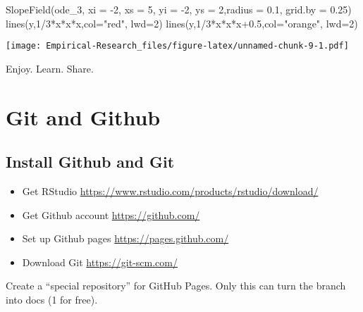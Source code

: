 \documentclass[
]{book}
\newenvironment{Shaded}{\begin{snugshade}}{\end{snugshade}}
\newcommand{\AttributeTok}[1]{\textcolor[rgb]{0.77,0.63,0.00}{#1}}
\newcommand{\DecValTok}[1]{\textcolor[rgb]{0.00,0.00,0.81}{#1}}
\newcommand{\FloatTok}[1]{\textcolor[rgb]{0.00,0.00,0.81}{#1}}
\newcommand{\FunctionTok}[1]{\textcolor[rgb]{0.00,0.00,0.00}{#1}}
\newcommand{\NormalTok}[1]{#1}
\newcommand{\SpecialCharTok}[1]{\textcolor[rgb]{0.00,0.00,0.00}{#1}}
\newcommand{\StringTok}[1]{\textcolor[rgb]{0.31,0.60,0.02}{#1}}
\providecommand{\tightlist}{%
  \setlength{\itemsep}{0pt}\setlength{\parskip}{0pt}}
\begin{document}
\begin{Shaded}
\begin{Highlighting}[]
\FunctionTok{SlopeField}\NormalTok{(ode\_3, }\AttributeTok{xi =} \SpecialCharTok{{-}}\DecValTok{2}\NormalTok{, }\AttributeTok{xs =} \DecValTok{5}\NormalTok{, }\AttributeTok{yi =} \SpecialCharTok{{-}}\DecValTok{2}\NormalTok{, }\AttributeTok{ys =} \DecValTok{2}\NormalTok{,}\AttributeTok{radius =} \FloatTok{0.1}\NormalTok{, }\AttributeTok{grid.by =} \FloatTok{0.25}\NormalTok{)}
\FunctionTok{lines}\NormalTok{(y,}\DecValTok{1}\SpecialCharTok{/}\DecValTok{3}\SpecialCharTok{*}\NormalTok{x}\SpecialCharTok{*}\NormalTok{x}\SpecialCharTok{*}\NormalTok{x,}\AttributeTok{col=}\StringTok{"red"}\NormalTok{, }\AttributeTok{lwd=}\DecValTok{2}\NormalTok{)}
\FunctionTok{lines}\NormalTok{(y,}\DecValTok{1}\SpecialCharTok{/}\DecValTok{3}\SpecialCharTok{*}\NormalTok{x}\SpecialCharTok{*}\NormalTok{x}\SpecialCharTok{*}\NormalTok{x}\FloatTok{+0.5}\NormalTok{,}\AttributeTok{col=}\StringTok{"orange"}\NormalTok{, }\AttributeTok{lwd=}\DecValTok{2}\NormalTok{)}
\end{Highlighting}
\end{Shaded}

\texttt{[image: Empirical-Research\_files/figure-latex/unnamed-chunk-9-1.pdf]}

Enjoy. Learn. Share.

\hypertarget{git-and-github}{%
\chapter{Git and Github}\label{git-and-github}}

\hypertarget{install-github-and-git}{%
\section{Install Github and Git}\label{install-github-and-git}}

\begin{itemize}
\tightlist
\item
  Get RStudio \url{https://www.rstudio.com/products/rstudio/download/}
\item
  Get Github account \url{https://github.com/}
\item
  Set up Github pages \url{https://pages.github.com/}
\item
  Download Git \url{https://git-scm.com/}
\end{itemize}

Create a ``special repository'' for GitHub Pages. Only this can turn the branch into docs (1 for free).
\end{document}
